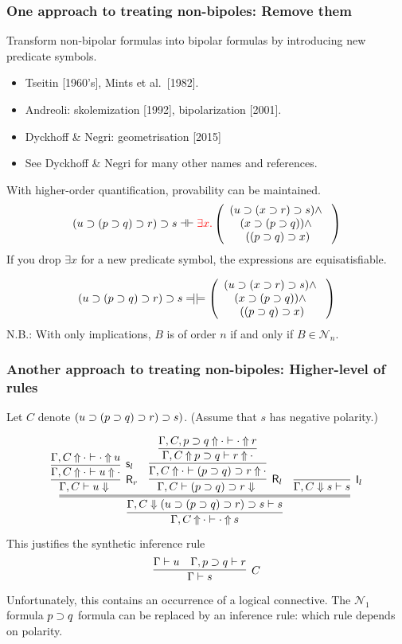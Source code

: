\documentclass[9pt]{beamer}
\begin{document}
\begin{frame}
\frametitle{One approach to treating non-bipoles: Remove them}

Transform non-bipolar formulas into bipolar formulas by introducing
new predicate symbols.

\begin{itemize}
\item Tseitin [1960's], Mints et al.~[1982].
\item Andreoli: skolemization [1992], bipolarization [2001].
\item Dyckhoff \& Negri: geometrisation [2015]
\item See Dyckhoff \& Negri for many other names and references.
\end{itemize}

\vfill\pause
With higher-order quantification, provability can be maintained.
\[
  (u\supset (p\supset q)\supset r) \supset s \dashv\vdash {\color{red}\exists x. }
\left(\begin{array}{c}
    (u\supset(x\supset r) \supset s) \wedge~\\
    (x\supset (p\supset q))  \wedge~\\
    ((p\supset q)\supset x)
\end{array}
\right)
\]
\pause
If you drop $\exists x$ for a new predicate symbol, the expressions
are equisatisfiable.

\newcommand{\sledom}{\Relbar\joinrel\mathrel{|}}

\[
  (u\impl (p\impl q)\impl r) \impl s \sledom \models
\left(\begin{array}{c}
    (u\impl (x\impl r) \impl s) \wedge~\\
    (x\impl (p\impl q))  \wedge~\\
    ((p\impl q)\impl x)
\end{array}
\right)
\]
\vfill
N.B.: With only implications, $B$ is of order $n$ if and only if $B\in\mathcal{N}_n$.
\vfill
\end{frame}

\begin{frame}
\frametitle{Another approach to treating non-bipoles: Higher-level of rules}

Let $C$ denote $(u\supset (p\supset q)\supset r) \supset s)$.  (Assume that
$s$ has negative polarity.)

\[
  \infer{\jUnf{\Gamma, C}{\cdot}{\cdot}{s}}{
  \infer={\jLf{\Gamma, C}{(u\impl (p\impl q)\impl r) \impl s}{s}}{
    \infer[\krelease_r]{\jRf{\Gamma,C}{u}}{
       \infer[\kstore_l]{\jUnf{\Gamma,C}{\cdot}{u}{\cdot}}
                        {\jUnf{\Gamma,C}{\cdot}{\cdot}{u}}}
& 
  \infer[\krelease_l]{\jRf{\Gamma,C}{(p\impl q)\impl r}}{
  \infer{\jUnf{\Gamma,C}{\cdot}{(p\impl q)\impl r}{\cdot}}{
  \infer{\jUnf{\Gamma,C}{p\impl q}{r}{\cdot}}{
\jUnf{\Gamma,C,p\impl q}{\cdot}{\cdot}{r}
}}}
& 
    \infer[\kinit_l]{\jLf{\Gamma,C}{s}{s}}{}
}}
\]
This justifies the synthetic inference rule
\[
  \infer[C]{\Gamma\seq s}{ \Gamma\seq u & \Gamma,p\impl q \seq r}
\]
Unfortunately, this contains an occurrence of a logical connective.
\vfill
The $\mathcal{N}_1$ formula $p\supset q$ formula can be
replaced by an inference rule: which rule depends on polarity.
\vfill
\end{frame}
\end{document}
